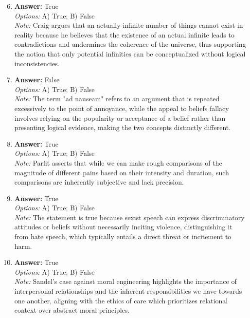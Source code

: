 \documentclass[12pt]{article}
\begin{document}
\begin{enumerate}[label=\arabic*.]
\setcounter{enumi}{5}
\item \textbf{Answer:} True
\\ \textit{Options:} A) True; B) False
\\ \textit{Note:} Craig argues that an actually infinite number of things cannot exist in reality because he believes that the existence of an actual infinite leads to contradictions and undermines the coherence of the universe, thus supporting the notion that only potential infinities can be conceptualized without logical inconsistencies.
\item \textbf{Answer:} False
\\ \textit{Options:} A) True; B) False
\\ \textit{Note:} The term "ad nauseam" refers to an argument that is repeated excessively to the point of annoyance, while the appeal to beliefs fallacy involves relying on the popularity or acceptance of a belief rather than presenting logical evidence, making the two concepts distinctly different.
\item \textbf{Answer:} True
\\ \textit{Options:} A) True; B) False
\\ \textit{Note:} Parfit asserts that while we can make rough comparisons of the magnitude of different pains based on their intensity and duration, such comparisons are inherently subjective and lack precision.
\item \textbf{Answer:} True
\\ \textit{Options:} A) True; B) False
\\ \textit{Note:} The statement is true because sexist speech can express discriminatory attitudes or beliefs without necessarily inciting violence, distinguishing it from hate speech, which typically entails a direct threat or incitement to harm.
\item \textbf{Answer:} True
\\ \textit{Options:} A) True; B) False
\\ \textit{Note:} Sandel's case against moral engineering highlights the importance of interpersonal relationships and the inherent responsibilities we have towards one another, aligning with the ethics of care which prioritizes relational context over abstract moral principles.
\end{enumerate}
\end{document}
